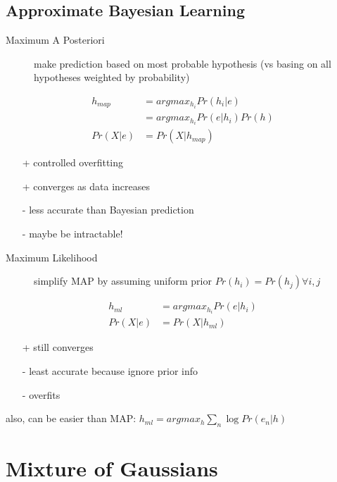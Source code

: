 \documentclass[]{article}
\theoremstyle{definition}
\begin{document}
    \subsection{Approximate Bayesian Learning}
    \label{sub:approximate_bayesian_learning}

    \begin{description}
        \item[Maximum A Posteriori] make prediction based on most probable hypothesis (vs basing on all hypotheses weighted by probability)
    \end{description}
    \begin{align*}
        h_{map} &= argmax_{h_i} Pr(h_i | e) \\
                &= argmax_{h_i} Pr(e | h_i) Pr(h) \\
        Pr(X | e) &= Pr(X | h_{map})
    \end{align*}
    \begin{itemize}
        \item[+] controlled overfitting
        \item[+] converges as data increases
        \item[-] less accurate than Bayesian prediction
        \item[-] maybe be intractable!
    \end{itemize}

    \begin{description}
        \item[Maximum Likelihood] simplify MAP by assuming uniform prior $Pr(h_i) = Pr(h_j) \forall i,j$
    \end{description}
    \begin{align*}
        h_{ml} &= argmax_{h_i} Pr(e | h_i) \\
        Pr(X | e) &= Pr(X | h_{ml})
    \end{align*}
    \begin{itemize}
        \item[+] still converges
        \item[-] least accurate because ignore prior info
        \item[-] overfits
    \end{itemize}
    also, can be easier than MAP: $h_{ml} = argmax_h \sum_n \log Pr(e_n|h)$


    \section{Mixture of Gaussians}
    \label{sec:mixture_of_gaussians}
\end{document}
